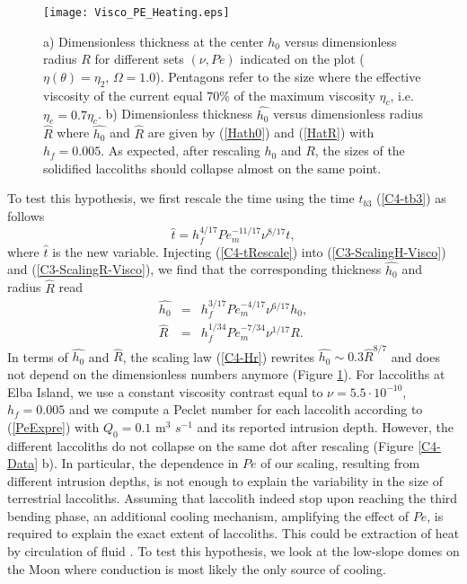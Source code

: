 \begin{figure}[h!]
  \begin{center}
    \graphicspath{ {/Users/thorey/Documents/These/Projet/Refroidissement/Skin_Model/Figure/Figure_Heating/} }
    \texttt{[image: Visco\_PE\_Heating.eps]}
    \caption{a)  Dimensionless thickness  at the  center $h_0$  versus
      dimensionless radius $R$ for different sets $(\nu,Pe)$ indicated
      on  the plot  ($\eta(\theta)=\eta_2$, $\Omega=1.0$).   Pentagons
      refer to the  size where the effective viscosity  of the current
      equal   $70\%$  of   the   maximum   viscosity  $\eta_c$,   i.e.
      $\eta_e=0.7\eta_c$.   b)   Dimensionless  thickness  $\hat{h_0}$
      versus  dimensionless  radius  $\hat{R}$ where  $\hat{h_0}$  and
      $\hat{R}$  are  given  by (\ref{Hath0})  and  (\ref{HatR})  with
      $h_f=0.005$.  As  expected, after  rescaling $h_0$ and  $R$, the
      sizes of the solidified laccoliths should collapse almost on the
      same point. }
    \label{C4-Visco_PE_Heating}
  \end{center}
\end{figure}


To test  this hypothesis,  we first  rescale the  time using  the time
$t_{b3}$ (\ref{C4-tb3}) as follows
\begin{equation}
  \hat{t}= h_f^{4/17} Pe_m^{-11/17}\nu^{8/17}t,
  \label{C4-tRescale}
\end{equation}
where  $\hat{t}$ is  the new  variable. Injecting  (\ref{C4-tRescale})
into (\ref{C3-ScalingH-Visco}) and  (\ref{C3-ScalingR-Visco}), we find
that the corresponding thickness $\hat{h_0}$ and radius $\hat{R}$ read
\begin{eqnarray}
  \hat{h_0}&=& h_f^{3/17}Pe_m^{-4/17}\nu^{6/17}h_0,\label{Hath0}\\
  \hat{R}&=& h_f^{1/34}Pe_m^{-7/34}\nu^{1/17}R.\label{HatR}
\end{eqnarray}
In terms of  $\hat{h_0}$ and $\hat{R}$, the  scaling law (\ref{C4-Hr})
rewrites $ \hat{h_0} \sim 0.3\hat{R}^{8/7}$ and does not depend on the
dimensionless numbers anymore  (Figure \ref{C4-Visco_PE_Heating}). For
laccoliths at Elba Island, we  use a constant viscosity contrast equal
to  $\nu =  5.5\cdot 10^{-10}$,  $h_f=0.005$ and  we compute  a Peclet
number for each laccolith  according to (\ref{PeExpre}) with $Q_0=0.1$
m$^3$  $s^{-1}$  and  its  reported  intrusion  depth.   However,  the
different laccoliths do  not collapse on the same  dot after rescaling
(Figure \ref{C4-Data}  b).  In particular,  the dependence in  $Pe$ of
our scaling, resulting from different  intrusion depths, is not enough
to  explain the  variability in  the size  of terrestrial  laccoliths.
Assuming that  laccolith indeed stop  upon reaching the  third bending
phase, an additional cooling mechanism, amplifying the effect of $Pe$,
is required to explain the exact  extent of laccoliths.  This could be
extraction of heat by  circulation of fluid \citep{Senger:2014tt}.  To
test this hypothesis, we look at the low-slope domes on the Moon where
conduction is most likely the only source of cooling.

